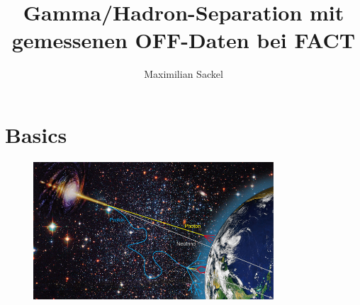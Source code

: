 \documentclass[aspectratio=1610, professionalfonts, 9pt]{beamer}
\title{Gamma/Hadron-Separation mit gemessenen OFF-Daten bei FACT}
\author[M.~Sackel]{Maximilian Sackel}
\institute[Experimental Physics 5b]{Experimental Physiks 5b \\  Astroteilchenphysik}
\begin{document}
\maketitle

\section{Basics}
\begin{frame}
  \begin{figure}
	\centering
	\includegraphics[width=0.8\textwidth]{./images/sources-detection.jpg}
	\cite{Overview}
  \end{figure}
\end{frame}
\end{document}
